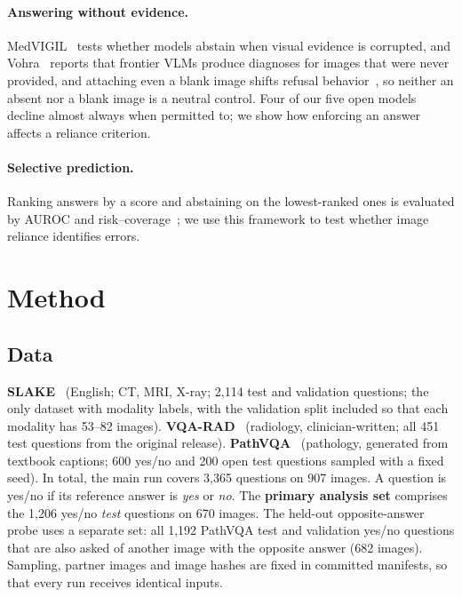 \documentclass[10pt,twocolumn,letterpaper]{article}
\begin{document}
\paragraph{Answering without evidence.} MedVIGIL~\cite{jiang2026medvigil} tests whether models abstain when
visual evidence is corrupted, and Vohra~\cite{vohra2026hearsay} reports that frontier VLMs produce diagnoses for
images that were never provided, and attaching even a blank image shifts refusal behavior~\cite{zhang2026uncontrolled},
so neither an absent nor a blank image is a neutral control. Four of our five open models decline almost always
when permitted to; we show how enforcing an answer affects a reliance criterion.

\paragraph{Selective prediction.} Ranking answers by a score and abstaining on the lowest-ranked ones is evaluated
by AUROC and risk--coverage~\cite{geifman2017selective}; we use this framework to test whether image reliance
identifies errors.

\section{Method}
\label{sec:method}
\subsection{Data}
\textbf{SLAKE}~\cite{liu2021slake} (English; CT, MRI, X-ray; 2,114 test and validation questions; the only
dataset with modality labels, with the validation split included so that each modality has 53--82 images).
\textbf{VQA-RAD}~\cite{lau2018vqarad} (radiology, clinician-written; all 451 test questions from the original
release). \textbf{PathVQA}~\cite{he2020pathvqa} (pathology, generated from textbook captions; 600 yes/no and 200
open test questions sampled with a fixed seed). In total, the main run covers 3,365 questions on 907 images. A
question is yes/no if its reference answer is \emph{yes} or \emph{no}. The \textbf{primary analysis set} comprises
the 1,206 yes/no \emph{test} questions on 670 images. The held-out opposite-answer probe uses a separate set: all
1,192 PathVQA test and validation yes/no questions that are also asked of another image with the opposite answer
(682 images). Sampling, partner images and image hashes are fixed in committed manifests, so that every run
receives identical inputs.
\end{document}
